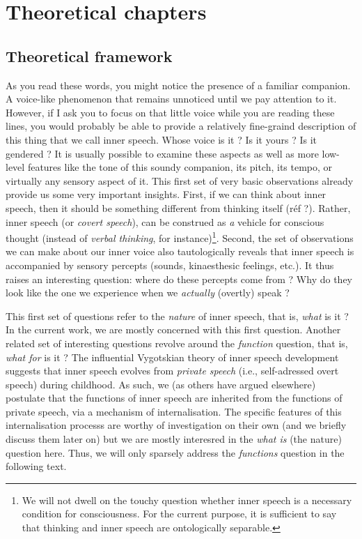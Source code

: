 \documentclass[a4paper,12pt,twoside,openright,oldfontcommands]{memoir}
\let\rmarkdownfootnote\footnote%
\def\footnote{\protect\rmarkdownfootnote}
\newcommand{\initial}[1]{
	\lettrine[lines=3,lhang=0.33,nindent=0em]{
		\color{gray}
     		{\textsc{#1}}}{}}
\begin{document}
\listoffigures
{}
\newpage


\part{Theoretical chapters}\label{part-theoretical-chapters}

\chapter{Theoretical framework}\label{intro}

\initial{A}s you read these words, you might notice the presence of a
familiar companion. A voice-like phenomenon that remains unnoticed until
we pay attention to it. However, if I ask you to focus on that little
voice while you are reading these lines, you would probably be able to
provide a relatively fine-graind description of this thing that we call
inner speech. Whose voice is it ? Is it yours ? Is it gendered ? It is
usually possible to examine these aspects as well as more low-level
features like the tone of this soundy companion, its pitch, its tempo,
or virtually any sensory aspect of it. This first set of very basic
observations already provide us some very important insights. First, if
we can think about inner speech, then it should be something different
from thinking itself (réf ?). Rather, inner speech (or \emph{covert
speech}), can be construed as \emph{a} vehicle for conscious thought
(instead of \emph{verbal thinking}, for instance)\footnote{We will not
  dwell on the touchy question whether inner speech is a necessary
  condition for consciousness. For the current purpose, it is sufficient
  to say that thinking and inner speech are ontologically separable.}.
Second, the set of observations we can make about our inner voice also
tautologically reveals that inner speech is accompanied by sensory
percepts (sounds, kinaesthesic feelings, etc.). It thus raises an
interesting question: where do these percepts come from ? Why do they
look like the one we experience when we \emph{actually} (overtly) speak
?

This first set of questions refer to the \emph{nature} of inner speech,
that is, \emph{what} is it ? In the current work, we are mostly
concerned with this first question. Another related set of interesting
questions revolve around the \emph{function} question, that is,
\emph{what for} is it ? The influential Vygotskian theory of inner
speech development suggests that inner speech evolves from \emph{private
speech} (i.e., self-adressed overt speech) during childhood. As such, we
(as others have argued elsewhere) postulate that the functions of inner
speech are inherited from the functions of private speech, via a
mechanism of internalisation. The specific features of this
internalisation processs are worthy of investigation on their own (and
we briefly discuss them later on) but we are mostly interesred in the
\emph{what is} (the nature) question here. Thus, we will only sparsely
address the \emph{functions} question in the following text.
\end{document}
